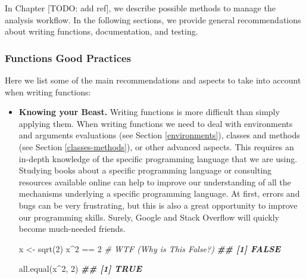 \documentclass[
  11pt,
]{book}
\newenvironment{Shaded}{\begin{snugshade}}{\end{snugshade}}
\newcommand{\CommentTok}[1]{\textcolor[rgb]{0.56,0.35,0.01}{\textit{#1}}}
\newcommand{\DecValTok}[1]{\textcolor[rgb]{0.00,0.00,0.81}{#1}}
\newcommand{\DocumentationTok}[1]{\textcolor[rgb]{0.56,0.35,0.01}{\textbf{\textit{#1}}}}
\newcommand{\FunctionTok}[1]{\textcolor[rgb]{0.00,0.00,0.00}{#1}}
\newcommand{\NormalTok}[1]{#1}
\newcommand{\OtherTok}[1]{\textcolor[rgb]{0.56,0.35,0.01}{#1}}
\newcommand{\SpecialCharTok}[1]{\textcolor[rgb]{0.00,0.00,0.00}{#1}}
\newenvironment{code-tex-bad}
  {\begingroup\definecolor{shadecolor}{RGB}{255, 189, 185}}
  {\endgroup}
\newenvironment{code-tex-good}
  {\begingroup\definecolor{shadecolor}{RGB}{224, 240, 227}}
  {\endgroup}
\begin{document}
In Chapter {[}TODO: add ref{]}, we describe possible methods to manage the analysis workflow. In the following sections, we provide general recommendations about writing functions, documentation, and testing.

\hypertarget{functions-good-practices}{%
\subsubsection{Functions Good Practices}\label{functions-good-practices}}

Here we list some of the main recommendations and aspects to take into account when writing functions:

\begin{itemize}
\item
  \textbf{Knowing your Beast.} Writing functions is more difficult than simply applying them. When writing functions we need to deal with environments and arguments evaluations (see Section \ref{environments}), classes and methods (see Section \ref{classes-methods}), or other advanced aspects. This requires an in-depth knowledge of the specific programming language that we are using. Studying books about a specific programming language or consulting resources available online can help to improve our understanding of all the mechanisms underlying a specific programming language. At first, errors and bugs can be very frustrating, but this is also a great opportunity to improve our programming skills. Surely, Google and Stack Overflow will quickly become much-needed friends.

  \begin{code-tex-bad}

\begin{Shaded}
\begin{Highlighting}[]
\NormalTok{x }\OtherTok{\textless{}{-}} \FunctionTok{sqrt}\NormalTok{(}\DecValTok{2}\NormalTok{)}
\NormalTok{x}\SpecialCharTok{\^{}}\DecValTok{2} \SpecialCharTok{==} \DecValTok{2}  \CommentTok{\# WTF (Why is This False?)}
\DocumentationTok{\#\# [1] FALSE}
\end{Highlighting}
\end{Shaded}

  \end{code-tex-bad}

  \begin{code-tex-good}

\begin{Shaded}
\begin{Highlighting}[]
\FunctionTok{all.equal}\NormalTok{(x}\SpecialCharTok{\^{}}\DecValTok{2}\NormalTok{, }\DecValTok{2}\NormalTok{)}
\DocumentationTok{\#\# [1] TRUE}
\end{Highlighting}
\end{Shaded}


\end{code-tex-good}
\end{itemize}
\end{document}
